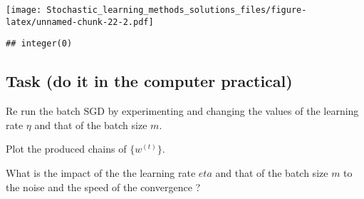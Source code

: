 \documentclass[
]{article}
\begin{document}
\texttt{[image: Stochastic\_learning\_methods\_solutions\_files/figure-latex/unnamed-chunk-22-2.pdf]}

\begin{verbatim}
## integer(0)
\end{verbatim}

\hypertarget{task-do-it-in-the-computer-practical-6}{%
\subsection{Task (do it in the computer
practical)}\label{task-do-it-in-the-computer-practical-6}}

Re run the batch SGD by experimenting and changing the values of the
learning rate \(\eta\) and that of the batch size \(m\).

Plot the produced chains of \(\{w^{(t)}\}\).

What is the impact of the the learning rate \(eta\) and that of the
batch size \(m\) to the noise and the speed of the convergence ?
\end{document}
